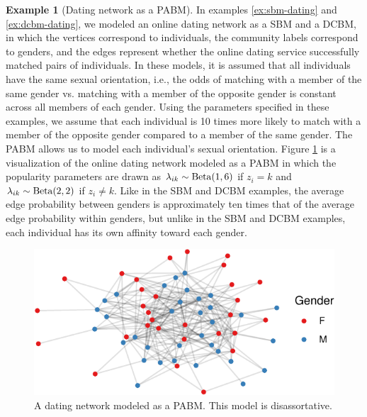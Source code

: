 \documentclass[
  12pt,
]{article}
\theoremstyle{definition}
\theoremstyle{definition}
\newtheorem{example}{Example}[section]
\theoremstyle{definition}
\theoremstyle{definition}
\theoremstyle{remark}
\begin{document}
\begin{example}[Dating network as a PABM]
\label{ex:pabm-dating}
In examples \ref{ex:sbm-dating} and \ref{ex:dcbm-dating}, we modeled an online dating network as a SBM and a DCBM, in which the vertices correspond to individuals, the community labels correspond to genders, and the edges represent whether the online dating service successfully matched pairs of individuals. 
In these models, it is assumed that all individuals have the same sexual orientation, i.e., the odds of matching with a member of the same gender vs. matching with a member of the opposite gender is constant across all members of each gender. 
Using the parameters specified in these examples, we assume that each individual is 10 times more likely to match with a member of the opposite gender compared to a member of the same gender. 
The PABM allows us to model each individual's sexual orientation. 
Figure \ref{fig:dating-pabm} is a visualization of the online dating network modeled as a PABM in which the popularity parameters are drawn as $\lambda_{ik} \sim \mathrm{Beta}(1, 6)$ if $z_i = k$ and $\lambda_{ik} \sim \mathrm{Beta}(2, 2)$ if $z_i \neq k$. 
Like in the SBM and DCBM examples, the average edge probability between genders is approximately ten times that of the average edge probability within genders, but unlike in the SBM and DCBM examples, each individual has its own affinity toward each gender. 

\begin{figure}[H]

{\centering \includegraphics{draft_files/figure-latex/dating-pabm-1} 

}

\caption{A dating network modeled as a PABM. This model is disassortative.}\label{fig:dating-pabm}
\end{figure}
\end{example}
\end{document}
